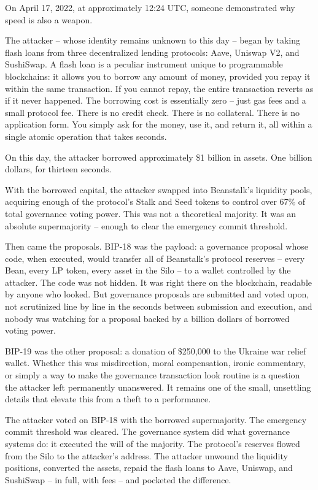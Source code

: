 \documentclass[
  11pt,
  openany]{report}
\begin{document}
On April 17, 2022, at approximately 12:24 UTC, someone demonstrated why speed is
also a weapon.

The attacker -- whose identity remains unknown to this day -- began by taking
flash loans from three decentralized lending protocols: Aave, Uniswap V2, and
SushiSwap. A flash loan is a peculiar instrument unique to programmable
blockchains: it allows you to borrow any amount of money, provided you repay it
within the same transaction. If you cannot repay, the entire transaction reverts
as if it never happened. The borrowing cost is essentially zero -- just gas fees
and a small protocol fee. There is no credit check. There is no collateral.
There is no application form. You simply ask for the money, use it, and return
it, all within a single atomic operation that takes seconds.

On this day, the attacker borrowed approximately \$1 billion in assets. One
billion dollars, for thirteen seconds.

With the borrowed capital, the attacker swapped into Beanstalk's liquidity
pools, acquiring enough of the protocol's Stalk and Seed tokens to control over
67\% of total governance voting power. This was not a theoretical majority. It
was an absolute supermajority -- enough to clear the emergency commit threshold.

Then came the proposals. BIP-18 was the payload: a governance proposal whose
code, when executed, would transfer all of Beanstalk's protocol reserves --
every Bean, every LP token, every asset in the Silo -- to a wallet controlled by
the attacker. The code was not hidden. It was right there on the blockchain,
readable by anyone who looked. But governance proposals are submitted and voted
upon, not scrutinized line by line in the seconds between submission and
execution, and nobody was watching for a proposal backed by a billion dollars of
borrowed voting power.

BIP-19 was the other proposal: a donation of \$250,000 to the Ukraine war relief
wallet. Whether this was misdirection, moral compensation, ironic commentary, or
simply a way to make the governance transaction look routine is a question the
attacker left permanently unanswered. It remains one of the small, unsettling
details that elevate this from a theft to a performance.

The attacker voted on BIP-18 with the borrowed supermajority. The emergency
commit threshold was cleared. The governance system did what governance systems
do: it executed the will of the majority. The protocol's reserves flowed from
the Silo to the attacker's address. The attacker unwound the liquidity
positions, converted the assets, repaid the flash loans to Aave, Uniswap, and
SushiSwap -- in full, with fees -- and pocketed the difference.
\end{document}
